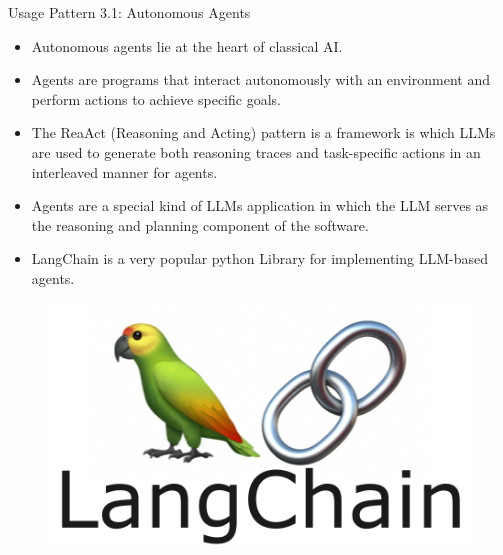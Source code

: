 \documentclass[handout]{beamer}
\begin{document}
\begin{frame}{Usage Pattern 3.1: Autonomous Agents}
\begin{scriptsize}
\begin{itemize}
\item Autonomous agents lie at the heart of classical AI.
\item Agents are programs that interact autonomously with an environment and perform actions to achieve specific goals.
\item The ReaAct (Reasoning and Acting) pattern \cite{yao2022react} is a framework is which LLMs are used to generate both reasoning traces and task-specific actions in an interleaved manner for agents.


\item Agents are a special kind of LLMs application in which the LLM serves as the reasoning and planning component of the software.

\item LangChain is a very popular python Library for implementing LLM-based agents. 
\end{itemize}


      \begin{figure}[h]
	\includegraphics[scale = 0.3]{pics/langchain3.png}
\end{figure}

\end{scriptsize}
\end{frame}
\end{document}
